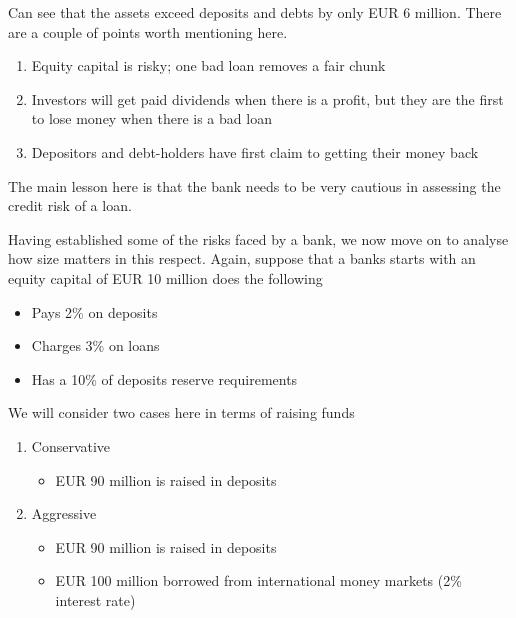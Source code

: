 \documentclass{beamer}
\begin{document}
\begin{frame}
  Can see that the assets exceed deposits and debts by only  EUR 6 million. 
There are a couple of points worth mentioning here. 
\begin{enumerate}
  \item Equity capital is risky; one bad loan removes a fair chunk
  \item Investors will get paid dividends when there is a profit, but they are the first to lose money when there is a bad loan
  \item Depositors and debt-holders have first claim to getting their money back
\end{enumerate}
The main lesson here is that the bank needs to be very cautious in assessing the credit risk of a loan.
\end{frame}

\begin{frame}
Having established some of the risks faced by a bank, we now move on to analyse how size matters in this respect. 
Again, suppose that a banks starts with an equity capital of EUR 10 million does the following
\begin{itemize}
  \item Pays 2\% on deposits
  \item Charges 3\% on loans
  \item Has a 10\% of deposits reserve requirements 
\end{itemize}
\end{frame}

\begin{frame}
  We will consider two cases here in terms of raising funds
\begin{enumerate}
  \item Conservative 
  \begin{itemize}
    \item  EUR 90 million is raised in deposits
  \end{itemize} 
 \item Aggressive 
  \begin{itemize}
    \item EUR 90 million is raised in deposits
    \item EUR 100 million borrowed from international money markets (2\% interest rate)
  \end{itemize}
\end{enumerate}
\end{frame}
\end{document}
